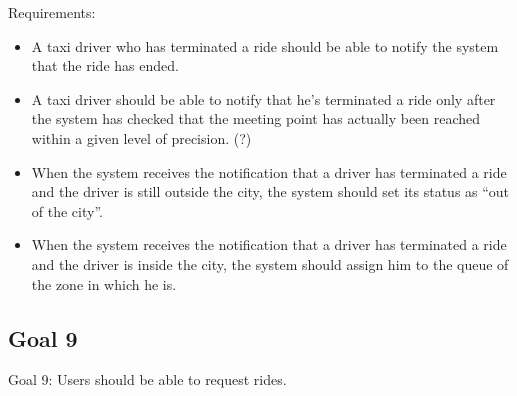 \documentclass{book}
\begin{document}
Requirements:
\begin{itemize}
\item A taxi driver who has terminated a ride should be able to notify the system that the ride has ended.
\item A taxi driver should be able to notify that he’s terminated a ride only after the system has checked that the meeting point has actually been reached within a given level of precision. (?) 
\item When the system receives the notification that a driver has terminated a ride and the driver is still outside the city, the system should set its status as “out of the city”.
\item When the system receives the notification that a driver has terminated a ride and the driver is inside the city, the system should assign him to the queue of the zone in which he is.
\end{itemize}

\subsection{Goal 9}
Goal 9: Users should be able to request rides.
\end{document}
